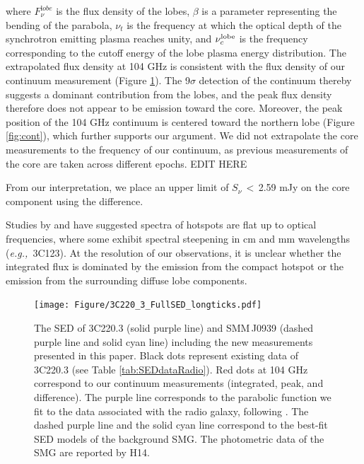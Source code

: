 \documentclass[twocolumn,apj,numberedappendix]{emulateapj}
\newcommand{\eg}{{\sl e.g.,~}}
\begin{document}
where $F_{\nu}^{\mathrm lobe}$ is the flux density of the lobes, $\beta$ is a parameter representing the bending 
of the parabola, $\nu_t$ is the frequency at which the optical depth of the synchrotron emitting plasma reaches 
unity, and $\nu_c^{\rm lobe}$ is the frequency corresponding to the cutoff energy of the lobe plasma energy 
distribution. 
The extrapolated flux density at 104\,\,GHz is consistent with the flux density of our continuum 
measurement (Figure \ref{fig:SED}). The 9$\sigma$ detection of the continuum thereby suggests
a dominant contribution from the lobes, and the peak flux density therefore does not appear to be emission toward 
the core. Moreover, the peak position of the 104\,\,GHz continuum is
centered toward the northern lobe (Figure \ref{fig:cont}), which further supports our argument. We did not 
extrapolate the core measurements to the frequency of our continuum, as previous measurements of the core are 
taken 
across different epochs. 
EDIT HERE \par
From our interpretation, we place an upper limit of $S_\nu$\,$<$\,2.59 mJy on the core component using the difference.
\par
Studies by \citet{Meisenheimer89a} and \citet{Hardcastle08a} have suggested spectra of hotspots are flat up to optical frequencies, where some exhibit spectral steepening in cm and mm wavelengths (\eg 3C123). At the resolution of our observations, it is unclear whether the integrated flux is dominated by the emission from the compact hotspot or the emission from the surrounding diffuse lobe components.

\begin{figure}[!tbph]
\centering
\texttt{[image: Figure/3C220\_3\_FullSED\_longticks.pdf]}
\caption{The SED of 3C220.3 (solid purple line) and SMM\,J0939 (dashed purple line and solid cyan line) including the new measurements presented in this paper. 
Black dots represent existing data of 3C220.3 (see Table \ref{tab:SEDdataRadio}). Red dots at 104 GHz correspond to 
our continuum measurements (integrated, peak, and difference). The purple line corresponds to the parabolic function we 
fit to the data associated with the radio galaxy, following \citet{Cleary07a}. The dashed purple line and 
the solid cyan line correspond to the best-fit SED models of the background SMG. The photometric data of the SMG are reported by H14. \label{fig:SED}}
\end{figure}
\end{document}
